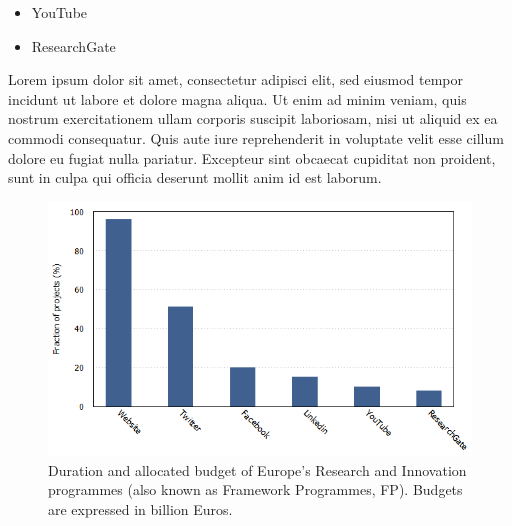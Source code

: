 \begin{itemize}
 \item YouTube
 \item ResearchGate
\end{itemize}

Lorem ipsum dolor sit amet, consectetur adipisci elit, sed eiusmod tempor incidunt ut labore et dolore magna aliqua. Ut enim ad minim veniam, quis nostrum exercitationem ullam corporis suscipit laboriosam, nisi ut aliquid ex ea commodi consequatur. Quis aute iure reprehenderit in voluptate velit esse cillum dolore eu fugiat nulla pariatur. Excepteur sint obcaecat cupiditat non proident, sunt in culpa qui officia deserunt mollit anim id est laborum.

\begin{figure}[!t] 
 \begin{center}
 \includegraphics[scale=0.4]{Images/Social_media.png}
 \caption{Duration and allocated budget of Europe's Research and Innovation programmes (also known as Framework Programmes, FP). Budgets are expressed in billion Euros.}
 \label{FP_funds}
 \end{center}
\end{figure}